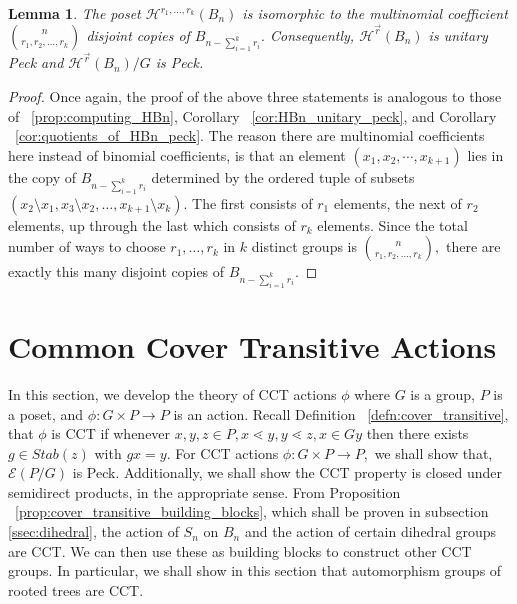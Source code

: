 \documentclass[10 pt]{amsart}
\theoremstyle{plain}
\newtheorem{lem}[thm]{Lemma}
\theoremstyle{definition}
\theoremstyle{remark}
\numberwithin{equation}{section}
\renewcommand{\vec}[1]{\overrightarrow{#1}}
\begin{document}
\begin{lem}
\label{lem:peck_quotients_vector_f}
The poset $\mathcal H^{r_1,\ldots, r_k}(B_n)$ is isomorphic to the multinomial coefficient \linebreak $\binom n {r_1,r_2,\ldots, r_k}$ disjoint copies of $B_{n- \sum_{i=1}^k r_i}.$ Consequently, $\mathcal H^{\vec r}(B_n)$ is unitary Peck and \linebreak
$\mathcal H^{\vec r}(B_n)/G$ is Peck.
\end{lem}
\begin{proof}
Once again, the proof of the above three statements is analogous to those of ~\ref{prop:computing_HBn}, Corollary ~\ref{cor:HBn_unitary_peck}, and Corollary ~\ref{cor:quotients_of_HBn_peck}. The reason there are multinomial coefficients here instead of binomial coefficients, is that an element $(x_1, x_2, \cdots, x_{k+1})$ lies in the copy of $B_{n -\sum_{i=1}^k r_i}$ determined by the ordered tuple of subsets $(x_2 \setminus x_1,x_3 \setminus x_2, \ldots, x_{k+1} \setminus x_k).$ The first consists of $r_1$ elements, the next of $r_2$ elements, up through the last which consists of $r_k$ elements. Since the total number of ways to choose $r_1,\ldots, r_k$ in $k$ distinct groups is $\binom n {r_1,r_2,\ldots, r_k},$ there are exactly this many disjoint copies of $B_{n- \sum_{i=1}^k r_i}.$
\end{proof}





\section{Common Cover Transitive Actions}
\label{sec:cover_transitive}
In this section, we develop the theory of CCT actions $\phi$ where $G$ is a group, $P$ is a poset, and $\phi:G\times P \rightarrow P$ is an action. Recall Definition ~\ref{defn:cover_transitive}, that $\phi$ is CCT if whenever $x,y,z \in P,x\lessdot y,y\lessdot z,x \in Gy$ then there exists $g \in Stab(z)$ with $gx = y.$ For CCT actions $\phi:G\times P \rightarrow P,$ we shall show that, $\mathcal E(P/G)$ is Peck. Additionally, we shall show the CCT property is closed under semidirect products, in the appropriate sense. From Proposition ~\ref{prop:cover_transitive_building_blocks}, which shall be proven in subsection \ref{ssec:dihedral}, the action of $S_n$ on $B_n$ and the action of certain dihedral groups are CCT. We can then use these as building blocks to construct other CCT groups. In particular, we shall show in this section that automorphism groups of rooted trees are CCT.
\end{document}

